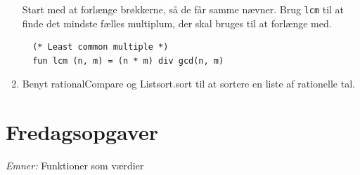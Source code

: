 \documentclass[a4paper,12pt]{article}
\begin{document}
\begin{enumerate}[{4}T1]
Start med at forlænge brøkkerne, så de får samme nævner. Brug
\lstinline{lcm} til at finde det mindste fælles multiplum, der skal
bruges til at forlænge med.

\begin{lstlisting}
  (* Least common multiple *)
  fun lcm (n, m) = (n * m) div gcd(n, m)
\end{lstlisting}

\item Benyt rationalCompare og Listsort.sort til at sortere en liste
  af rationelle tal.
\end{enumerate}

\newpage
\section{Fredagsopgaver}
\label{sec:tirsdagsopgaver}
\textit{Emner:} Funktioner som værdier
\end{document}
